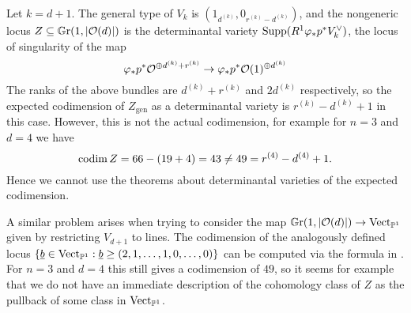 Let $k=d+1$. The general type of $V_k$ is
$(1_{d^{(k)}},0_{r^{(k)}-d^{(k)}})$, and the nongeneric locus $Z\subseteq \mathbb G \mathrm r(1,\lvert\mathcal{O}(d)\rvert)$ is the determinantal variety $\operatorname{Supp}(R^1\varphi_* p^* V_k^\vee)$, the locus of singularity of the map
\[
	\varphi_{*} p^{*} \mathcal{O}^{\oplus d^{(k)}+r^{(k)}}
	\to
	\varphi_{*} p^{*} \mathcal{O}(1)^{\oplus d^{(k)}}
\]
The ranks of the above bundles are $d^{(k)}+r^{(k)}$ and $2d^{(k)}$ respectively, so the expected codimension of $Z_{\text{gen}}$ as a determinantal variety is $r^{(k)}-d^{(k)}+1$ in this case. However, this is not the actual codimension, for example for $n=3$ and $d=4$ we have
\[ 
\operatorname{codim} Z = 66 - (19 + 4) = 43 \neq 49 = r^{(4)} - d^{(4)} + 1.
\]
Hence we cannot use the theorems about determinantal varieties of the expected codimension.


A similar problem arises when trying to consider the map $\mathbb G \mathrm r(1,\lvert\mathcal{O}(d)\rvert)\to \mathrm{Vect}_{\mathbb{P}^1}$ given by restricting $V_{d+1}$ to lines. The codimension of the analogously defined locus $\{\underline b \in \mathrm{Vect}_{\mathbb{P}^1} : \underline b \geq (2,1,\dotsc,1,0,\dotsc,0)\}$ can be computed via the formula in \cite[§5]{laumon-fascieaux-automorphes}. For $n=3$ and $d=4$ this still gives a codimension of $49$, so it seems for example that we do not have  an immediate description of the cohomology class of $Z$ as the pullback of some class in $\mathrm{Vect}_{\mathbb{P}^1}$. 